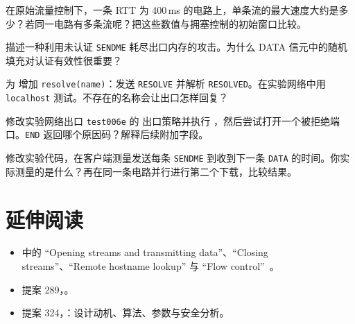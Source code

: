 \begin{esercizio}[2]\label{es:11-velocita}
在原始流量控制下，一条 RTT 为 400\,ms 的电路上，单条流的最大速度大约是多少？若同一电路有多条流呢？把这些数值与拥塞控制的初始窗口比较。
\end{esercizio}

\begin{esercizio}[2]\label{es:11-sendme-falso}
描述一种利用未认证 \texttt{SENDME} 耗尽出口内存的攻击。为什么 DATA 信元中的随机填充对认证有效性很重要？
\end{esercizio}

\begin{esercizio}[2]\label{es:11-resolve}
为  增加 \texttt{resolve(name)}：发送 \texttt{RESOLVE} 并解析 \texttt{RESOLVED}。在实验网络中用 \texttt{localhost} 测试。不存在的名称会让出口怎样回复？
\end{esercizio}

\begin{esercizio}[3]\label{es:11-policy}
修改实验网络出口 \texttt{test006e} 的  出口策略并执行 ，然后尝试打开一个被拒绝端口。\texttt{END} 返回哪个原因码？解释后续附加字段。
\end{esercizio}

\begin{esercizio}[3]\label{es:11-rtt}
修改实验代码，在客户端测量发送每条 \texttt{SENDME} 到收到下一条 \texttt{DATA} 的时间。你实际测量的是什么？再在同一条电路并行进行第二个下载，比较结果。
\end{esercizio}

\section*{延伸阅读}
\begin{itemize}
  \item {} 中的 \enquote{Opening streams and transmitting data}、\enquote{Closing streams}、\enquote{Remote hostname lookup} 与 \enquote{Flow control}~\cite{torspec}。
  \item 提案 289，。
  \item 提案 324，：设计动机、算法、参数与安全分析。
\end{itemize}
